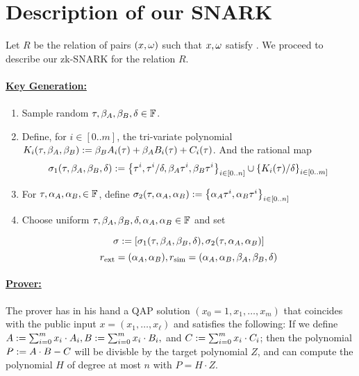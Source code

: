 \documentclass[11pt]{article}
\numberwithin{figure}{section} %
\begin{document}
\section{Description of our SNARK}\label{subsec:SNARK}


 Let $R$ be the relation of pairs $(x,\omega)$ such that $x,\omega$ satisfy \qap.
We proceed to describe our zk-SNARK for the relation $R$.

\paragraph{\underline{Key Generation:}}

\paragraph{}
\begin{enumerate}
 \item Sample random $\tau,\beta_A,\beta_B,\delta\in \mathbb F$.
 \item Define, for $i\in [0..m]$, the tri-variate polynomial $K_i(\tau,\beta_A,\beta_B):= \beta_B A_i(\tau) + \beta_A B_i(\tau) + C_i(\tau)$. And the rational map 
 \[\sigma_1(\tau,\beta_A,\beta_B,\delta) := \left\{\tau^i,\tau^i/\delta,\beta_A \tau^i,\beta_B\tau^i\right\}_{i\in[0..n]}\cup \left\{K_i(\tau)/\delta\right\}_{i\in [0..m]}
 \]
\item For $\tau,\alpha_A,\alpha_B,\in\mathbb F$, define $\sigma_2(\tau,\alpha_A,\alpha_B):= \left\{ \alpha_A\tau^i,\alpha_B \tau^i\right\}_{i\in [0..n]}$
\item Choose uniform $\tau,\beta_A,\beta_B,\delta,\alpha_A,\alpha_B\in \mathbb F$ and set

\[\sigma := \left[\sigma_1(\tau,\beta_A,\beta_B,\delta),\sigma_2(\tau,\alpha_A,\alpha_B)\right]
\]
\[r_{\mathrm{ext}}= (\alpha_A,\alpha_B), r_{\mathrm{sim}}= (\alpha_A,\alpha_B,\beta_A,\beta_B,\delta)\]
 \end{enumerate}

\paragraph{\underline{Prover:}\\}
The prover \per has in his hand a QAP solution $(x_0=1,x_1,\ldots,x_m)$ that coincides with the public input $x=(x_1,\ldots,x_\ell)$ and satisfies the following:
If we define $A:= \sum_{i=0}^m x_i\cdot A_i, B:= \sum_{i=0}^m x_i \cdot B_i,$ and $C:= \sum_{i=0}^m x_i \cdot C_i$;
then the polynomial $P:= A\cdot B - C$ will be divisble by the target polynomial $Z$, and \per can compute the polynomial $H$ of degree at most $n$ with $P=H\cdot Z$.
\end{document}
